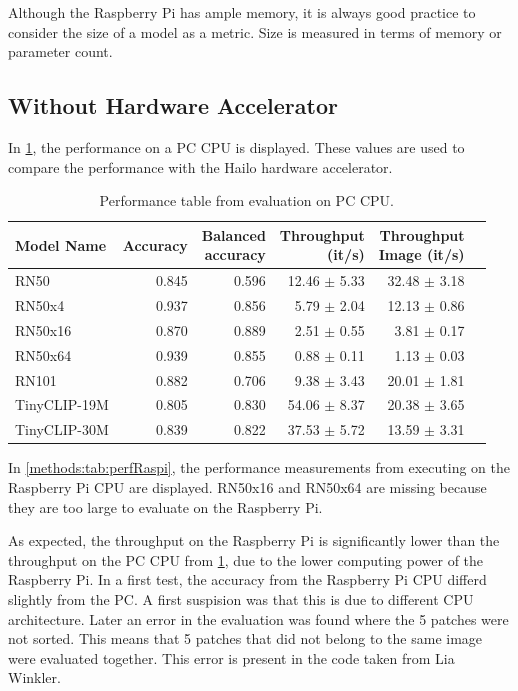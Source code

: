 Although the Raspberry Pi has ample memory, it is always good practice to consider the size of a model as a metric. Size is measured in terms of memory or parameter count.

\subsection{Without Hardware Accelerator}
In \cref{methods:tab:perfPC}, the performance on a PC CPU is displayed. These values are used to compare the performance with the Hailo hardware accelerator.

\begin{table}[tbp]
    \centering
    \begin{tabular}{l|rrrrr}
    \hline
        Model Name & Accuracy & \makecell{Balanced \\accuracy}&\makecell{Throughput\\(it/s)} & \makecell{Throughput \\ Image (it/s)} \\ \hline
        RN50 & 0.845& 0.596& 12.46 $\pm$ 5.33& 32.48 $\pm$ 3.18 \\ 
        RN50x4 & 0.937& 0.856& 5.79 $\pm$ 2.04& 12.13 $\pm$ 0.86 \\ 
        RN50x16 & 0.870& 0.889& 2.51 $\pm$ 0.55& 3.81 $\pm$ 0.17 \\ 
        RN50x64 & 0.939& 0.855& 0.88 $\pm$ 0.11& 1.13 $\pm$ 0.03\\
        RN101 & 0.882& 0.706& 9.38 $\pm$ 3.43& 20.01 $\pm$ 1.81\\  
        TinyCLIP-19M & 0.805& 0.830&54.06 $\pm$ 8.37& 20.38 $\pm$ 3.65 \\ 
        TinyCLIP-30M & 0.839& 0.822&37.53 $\pm$ 5.72& 13.59 $\pm$ 3.31 \\ 
    \end{tabular}
    \caption{Performance table from evaluation on PC CPU.}
    \label{methods:tab:perfPC}
\end{table}

In \cref{methods:tab:perfRaspi}, the performance measurements from executing on the Raspberry Pi CPU are displayed. RN50x16 and RN50x64 are missing because they are too large to evaluate on the Raspberry Pi.

As expected, the throughput on the Raspberry Pi is significantly lower than the throughput on the PC CPU from \cref{methods:tab:perfPC}, due to the lower computing power of the Raspberry Pi. In a first test, the accuracy from the Raspberry Pi CPU differd slightly from the PC.
A first suspision was that this is due to different CPU architecture.
Later an error in the evaluation was found where the 5 patches were not sorted.
This means that 5 patches that did not belong to the same image were evaluated together.
This error is present in the code taken from Lia Winkler.

